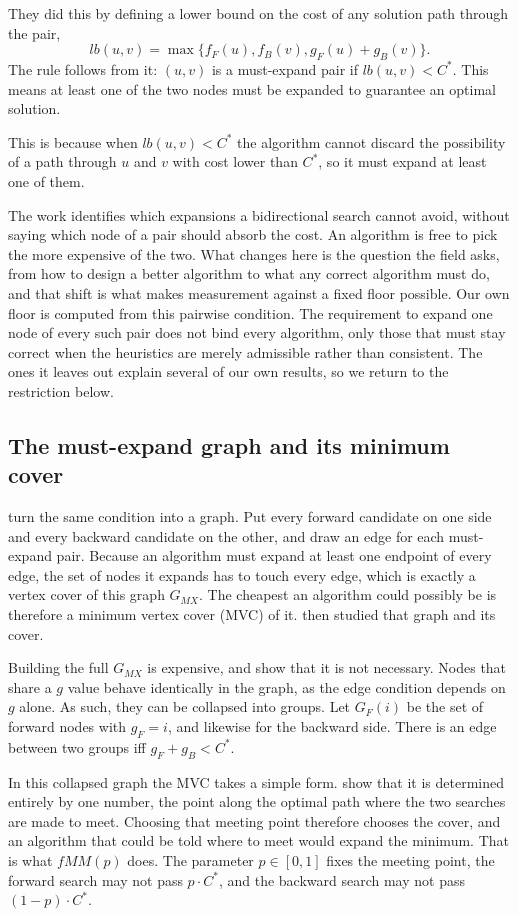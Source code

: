 \documentclass[letterpaper]{article} %
\begin{document}
They did this by defining a lower bound on the cost of any solution path through the pair, \[lb(u,v) = \max\{f_F(u), f_B(v), g_F(u)+g_B(v)\}.\] The rule follows from it: $(u,v)$ is a must-expand pair if $lb(u,v) < C^*$. This means at least one of the two nodes must be expanded to guarantee an optimal solution.

This is because when $lb(u,v) < C^*$ the algorithm cannot discard the possibility of a path through $u$ and $v$ with cost lower than $C^*$, so it must expand at least one of them.

The work identifies which expansions a bidirectional search cannot avoid, without saying which node of a pair should absorb the cost. An algorithm is free to pick the more expensive of the two. What changes here is the question the field asks, from how to design a better algorithm to what any correct algorithm must do, and that shift is what makes measurement against a fixed floor possible. Our own floor is computed from this pairwise condition. The requirement to expand one node of every such pair does not bind every algorithm, only those that must stay correct when the heuristics are merely admissible rather than consistent. The ones it leaves out explain several of our own results, so we return to the restriction below.

\subsection{The must-expand graph and its minimum cover}
\citet{chen2017nbs} turn the same condition into a graph. Put every forward candidate on one side and every backward candidate on the other, and draw an edge for each must-expand pair. Because an algorithm must expand at least one endpoint of every edge, the set of nodes it expands has to touch every edge, which is exactly a vertex cover of this graph $G_{MX}$. The cheapest an algorithm could possibly be is therefore a minimum vertex cover (MVC) of it. \citet{shaham2017minimal} then studied that graph and its cover.

Building the full $G_{MX}$ is expensive, and \citet{shaham2017minimal} show that it is not necessary. Nodes that share a $g$ value behave identically in the graph, as the edge condition depends on $g$ alone. As such, they can be collapsed into groups. Let $G_F(i)$ be the set of forward nodes with $g_F = i$, and likewise for the backward side. There is an edge between two groups iff $g_F + g_B < C^*$.

In this collapsed graph the MVC takes a simple form. \citet{shaham2017minimal} show that it is determined entirely by one number, the point along the optimal path where the two searches are made to meet. Choosing that meeting point therefore chooses the cover, and an algorithm that could be told where to meet would expand the minimum. That is what $fMM(p)$ does. The parameter $p \in [0,1]$ fixes the meeting point, the forward search may not pass $p \cdot C^*$, and the backward search may not pass $(1-p) \cdot C^*$.
\end{document}
